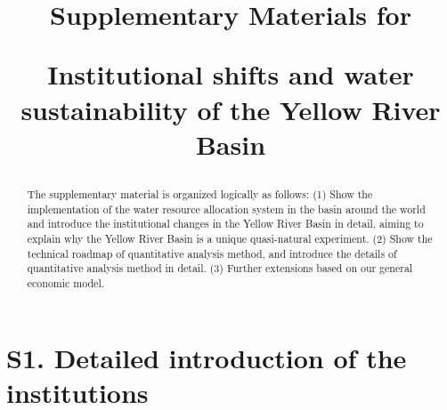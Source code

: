 \documentclass{article}
\title{Supplementary Materials for

Institutional shifts and water sustainability of the Yellow River Basin
}
\begin{document}
\maketitle


\begin{abstract}
    The supplementary material is organized logically as follows:
    (1) Show the implementation of the water resource allocation system in the basin around the world and introduce the institutional changes in the Yellow River Basin in detail, aiming to explain why the Yellow River Basin is a unique quasi-natural experiment.
    (2) Show the technical roadmap of quantitative analysis method, and introduce the details of quantitative analysis method in detail.
    (3) Further extensions based on our general economic model.
\end{abstract}

\section*{S1. Detailed introduction of the institutions}
\end{document}
